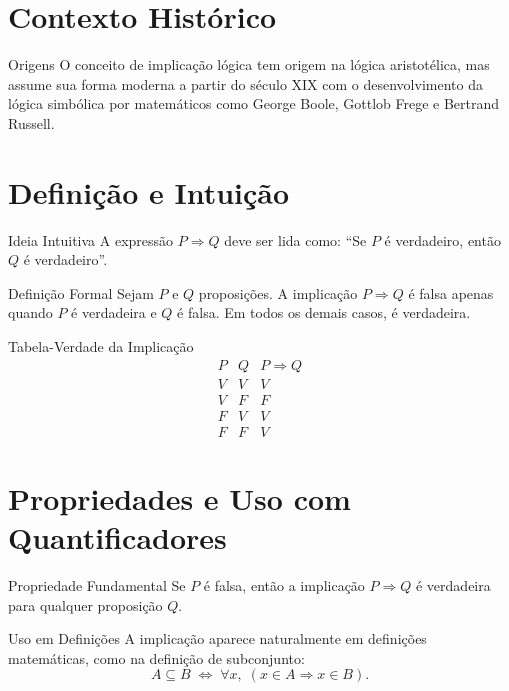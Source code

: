 \documentclass[12pt,a4paper,openright]{book}
\begin{document}
\section{Contexto Histórico}

\begin{block}{Origens}
O conceito de implicação lógica tem origem na lógica aristotélica, mas assume sua forma moderna a partir do século XIX com o desenvolvimento da lógica simbólica por matemáticos como George Boole, Gottlob Frege e Bertrand Russell.
\end{block}

\section{Definição e Intuição}

\begin{block}{Ideia Intuitiva}
A expressão \(P \Rightarrow Q\) deve ser lida como: “Se \(P\) é verdadeiro, então \(Q\) é verdadeiro”.
\end{block}

\begin{block}{Definição Formal}
Sejam \(P\) e \(Q\) proposições. A implicação \(P \Rightarrow Q\) é falsa apenas quando \(P\) é verdadeira e \(Q\) é falsa. Em todos os demais casos, é verdadeira.
\end{block}

\begin{block}{Tabela-Verdade da Implicação}
\[
\begin{array}{c|c|c}
P & Q & P \Rightarrow Q \\ \hline
V & V & V \\
V & F & F \\
F & V & V \\
F & F & V
\end{array}
\]
\end{block}

\section{Propriedades e Uso com Quantificadores}

\begin{block}{Propriedade Fundamental}
Se \(P\) é falsa, então a implicação \(P \Rightarrow Q\) é verdadeira para qualquer proposição \(Q\).
\end{block}

\begin{block}{Uso em Definições}
A implicação aparece naturalmente em definições matemáticas, como na definição de subconjunto:
\[
A \subseteq B \;\Longleftrightarrow\; \forall x,\; (x \in A \Rightarrow x \in B).
\]
\end{block}
\end{document}
